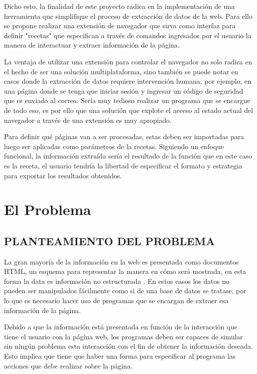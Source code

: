 \documentclass[12pt]{report}
\begin{document}
Dicho esto, la finalidad de este proyecto radica en la implementación de una herramienta que simplifique el proceso de extracción de datos de la web. Para ello se propone realizar una extensión de navegador que sirva como interfaz para definir "recetas" que especifican a través de comandos ingresados por el usuario la manera de interactuar y extraer información de la página.

La ventaja de utilizar una extensión para controlar el navegador no solo radica en el hecho de ser una solución multiplataforma, sino también se puede notar en casos donde la extracción de datos requiere intervención humana, por ejemplo, en una página donde se tenga que iniciar sesión y ingresar un código de seguridad que es enviado al correo. Sería muy tedioso realizar un programa que se encargue de todo eso, es por ello que una solución que explote el acceso al estado actual del navegador a través de una extensión es muy apropiado.

Para definir qué páginas van a ser procesadas, estas deben ser importadas para luego ser aplicadas como parámetros de la recetas. Siguiendo un enfoque funcional, la información extraída sería el resultado de la función que en este caso es la receta, el usuario tendría la libertad de especificar el formato y estrategia para exportar los resultados obtenidos.

\break


\chapter{El Problema}

\section[Planteamiento del Problema]{PLANTEAMIENTO DEL PROBLEMA}

La gran mayoría de la información en la web es presentada como documentos HTML, un esquema para representar la manera en cómo será mostrada, en esta forma la data es información no estructurada \cite{chaulagain2017cloud}. En estos casos los datos no pueden ser manipulados fácilmente como si de una base de datos se tratase, por lo que es necesario hacer uso de programas que se encargan de extraer esa información de la página.

Debido a que la información está presentada en función de la interacción que tiene el usuario con la página web, los programas deben ser capaces de simular sin ningún problema esta interacción con el fin de obtener la información deseada. Esto implica que tiene que haber una forma para especificar al programa las acciones que debe realizar sobre la página.
\end{document}
